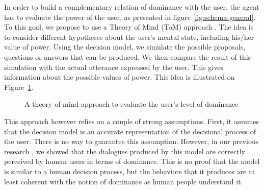 \documentclass[sigconf]{aamas}  %
\begin{document}
	In order to build a complementary relation of dominance with the user, the agent has to evaluate the power of the user, as presented in figure \ref{fig:schema-general}. To this goal, we propose to use a Theory of Mind (ToM) approach \cite{premack1978does}. The idea is to consider different hypotheses about the user's mental state, including his/her value of power. Using the decision model, we simulate the possible proposals, questions or answers that can be produced. We then compare the result of this simulation with the actual utterance expressed by the user. This gives information about the possible values of power. This idea is illustrated on Figure~\ref{fig:tom}.
		
	\begin{figure}
			\caption{A theory of mind approach to evaluate the user's level of dominance} 
			\label{fig:tom}
	\end{figure} 

	This approach however relies on a couple of strong assumptions. First, it assumes that the decision model is an accurate representation of the decisional process of the user. There is no way to guarantee this assumption. However, in our previous research \cite{ouali2017computational}, we showed that the dialogues produced by this model are correctly perceived by human users in terms of dominance. This is no proof that the model is similar to a human decision process, but the behaviors that it produces are at least coherent with the notion of dominance as human people understand it.
	
\end{document}
